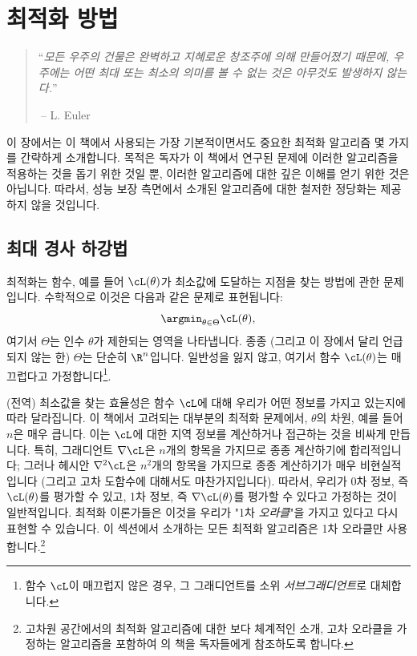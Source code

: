 \documentclass[../../book-main_ko.tex]{subfiles}
\begin{document}
\chapter{최적화 방법}
\label{app:optimization}

\begin{quote}
``{\em 모든 우주의 건물은 완벽하고 지혜로운 창조주에 의해 만들어졌기 때문에, 우주에는 어떤 최대 또는 최소의 의미를 볼 수 없는 것은 아무것도 발생하지 않는다.}''

$~$\hfill -- L. Euler
 \end{quote}
\vspace{5mm}

이 장에서는 이 책에서 사용되는 가장 기본적이면서도 중요한 최적화 알고리즘 몇 가지를 간략하게 소개합니다. 목적은 독자가 이 책에서 연구된 문제에 이러한 알고리즘을 적용하는 것을 돕기 위한 것일 뿐, 이러한 알고리즘에 대한 깊은 이해를 얻기 위한 것은 아닙니다. 따라서, 성능 보장 측면에서 소개된 알고리즘에 대한 철저한 정당화는 제공하지 않을 것입니다.

\section{최대 경사 하강법}


최적화는 함수, 예를 들어 \(\cL(\theta)\)가 최소값에 도달하는 지점을 찾는 방법에 관한 문제입니다. 수학적으로 이것은 다음과 같은 문제로 표현됩니다:
\begin{equation}
    \argmin_{\theta \in \Theta} \cL(\theta),
\end{equation}
여기서 \(\Theta\)는 인수 \(\theta\)가 제한되는 영역을 나타냅니다. 종종 (그리고 이 장에서 달리 언급되지 않는 한) \(\Theta\)는 단순히 \(\R^{n}\)입니다. 일반성을 잃지 않고, 여기서 함수 \(\cL(\theta)\)는 매끄럽다고 가정합니다\footnote{함수 \(\cL\)이 매끄럽지 않은 경우, 그 그래디언트를 소위 \textit{서브그래디언트}로 대체합니다.}. 


(전역) 최소값을 찾는 효율성은 함수 \(\cL\)에 대해 우리가 어떤 정보를 가지고 있는지에 따라 달라집니다. 이 책에서 고려되는 대부분의 최적화 문제에서, \(\theta\)의 차원, 예를 들어 \(n\)은 매우 큽니다. 이는 \(\cL\)에 대한 지역 정보를 계산하거나 접근하는 것을 비싸게 만듭니다. 특히, 그래디언트 \(\nabla \cL\)은 \(n\)개의 항목을 가지므로 종종 계산하기에 합리적입니다; 그러나 헤시안 \(\nabla^{2} \cL\)은 \(n^{2}\)개의 항목을 가지므로 종종 계산하기가 매우 비현실적입니다 (그리고 고차 도함수에 대해서도 마찬가지입니다). 따라서, 우리가 0차 정보, 즉 \(\cL(\theta)\)를 평가할 수 있고, 1차 정보, 즉 \(\nabla \cL(\theta)\)를 평가할 수 있다고 가정하는 것이 일반적입니다. 최적화 이론가들은 이것을 우리가 "1차 \textit{오라클}"을 가지고 있다고 다시 표현할 수 있습니다. 이 섹션에서 소개하는 모든 최적화 알고리즘은 1차 오라클만 사용합니다.\footnote{고차원 공간에서의 최적화 알고리즘에 대한 보다 체계적인 소개, 고차 오라클을 가정하는 알고리즘을 포함하여 \cite{Wright-Ma-2022}의 책을 독자들에게 참조하도록 합니다.}
\end{document}
